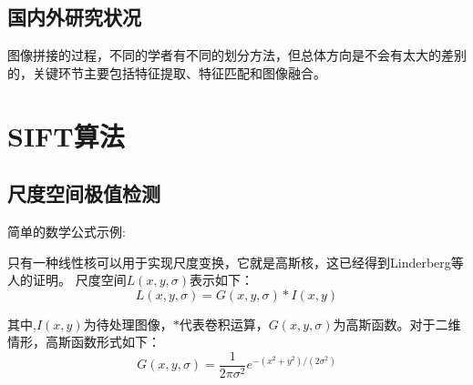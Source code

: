 \documentclass[10.5pt,a4paper]{article}
\numberwithin{equation}{section}
\numberwithin{figure}{section}
\numberwithin{table}{section}
\begin{document}
\subsection{国内外研究状况}
图像拼接的过程，不同的学者有不同的划分方法，但总体方向是不会有太大的差别的，关键环节主要包括特征提取、特征匹配和图像融合。
\newpage
\section{SIFT算法\label{sectionSift}}

\subsection{尺度空间极值检测}

简单的数学公式示例:\par
只有一种线性核可以用于实现尺度变换，它就是高斯核，这已经得到Linderberg等人的证明\cite{lindeberg1994scale}。
尺度空间$L(x,y,\sigma)$表示如下：
\begin{equation}
L(x,y,\sigma) = G(x,y,\sigma) * I(x,y)
\end{equation}
\par
其中,$I(x,y)$为待处理图像，$*$代表卷积运算，$G(x,y,\sigma)$为高斯函数\cite{lowe2004distinctive}。对于二维情形，高斯函数形式如下：
\begin{equation}
G(x,y,\sigma) = \frac{1}{2\pi\sigma^2}e^{-(x^2+y^2)/(2\sigma^2)}
\end{equation}
\end{document}
